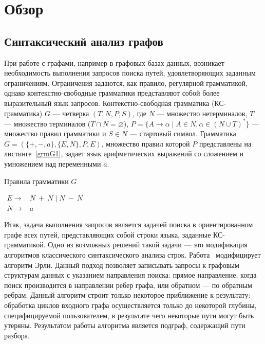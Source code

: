 \section{Обзор}
\subsection{Синтаксический анализ графов}
При работе с графами, например в графовых базах данных, возникает необходимость выполнения запросов поиска путей, удовлетворяющих заданным ограничениям. Ограничения задаются, как правило, регулярной грамматикой, однако контекстно-свободные грамматики представляют собой более выразительный язык запросов. Контекстно-свободная грамматика (КС-грамматика) $G$ --- четверка $(T, N, P, S)$, где $N$ --- множество нетерминалов, $T$ --- множество терминалов ($T \cap N = \varnothing$), $P = \{ A \rightarrow \alpha \mid A \in N, \alpha \in (N \cup T)^*\}$ --- множество правил грамматики и $S \in N$ --- стартовый символ. Грамматика $G = (\{+, -, a\}, \{ E, N \}, P, E)$, множество правил которой $P$ представлены на листинге~\ref{grmG1}, задает язык арифметических выражений со сложением и умножением над переменными $a$.

\begin{listing}
\caption{Правила грамматики $G$}
\label{grmG1}
\centering
$\begin{array}{ll}
E \rightarrow & N \ + \ N \mid N \ - \ N
\\
N \rightarrow & a
\end{array}$
 \end{listing}

Итак, задача выполнения запросов является задачей поиска в ориентированном графе всех путей, представляющих собой строки языка, заданные КС-грамматикой. Одно из возможных решений такой задачи --- это модификация алгоритмов классического синтаксического анализа строк. Работа~\cite{Sevon} модифицирует алгоритм Эрли. Данный подход позволяет записывать запросы к графовым структурам данных с указанием направления поиска: прямое направление, когда поиск производится в направлении ребер графа, или обратном --- по обратным ребрам. Данный алгоритм строит только некоторое приближение к результату: обработка циклов входного графа осуществляется только до некоторой глубины, специфицируемой пользователем, в результате чего некоторые пути могут быть утеряны. Результатом работы алгоритма является подграф, содержащий пути разбора. 

